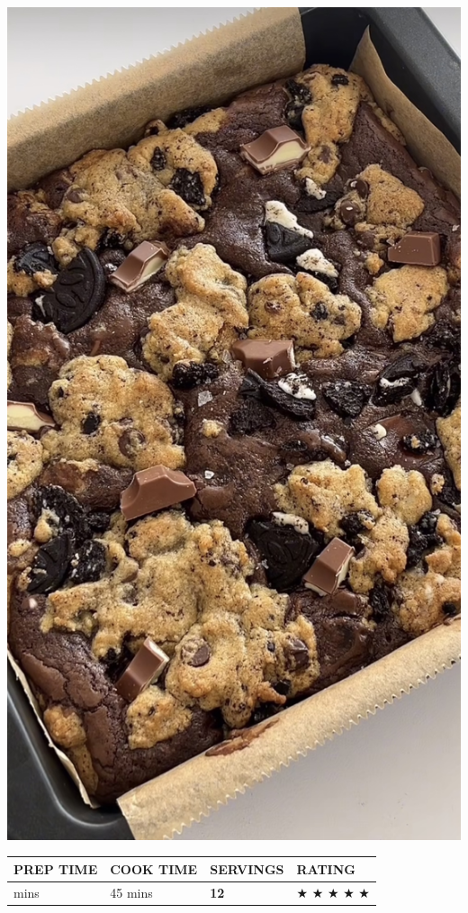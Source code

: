 \documentclass[
]{book}
\begin{document}
\includegraphics{lb.jpg}

\begin{longtable}[]{@{}llll@{}}
\toprule\noalign{}
\textbf{PREP TIME} & \textbf{COOK TIME} & \textbf{SERVINGS} &
\textbf{RATING} \\
\midrule\noalign{}
\endhead
\bottomrule\noalign{}
\endlastfoot
15 mins & 45 mins & \textbf{12} & ★ ★ ★ ★ ★ \\
\end{longtable}
\end{document}
